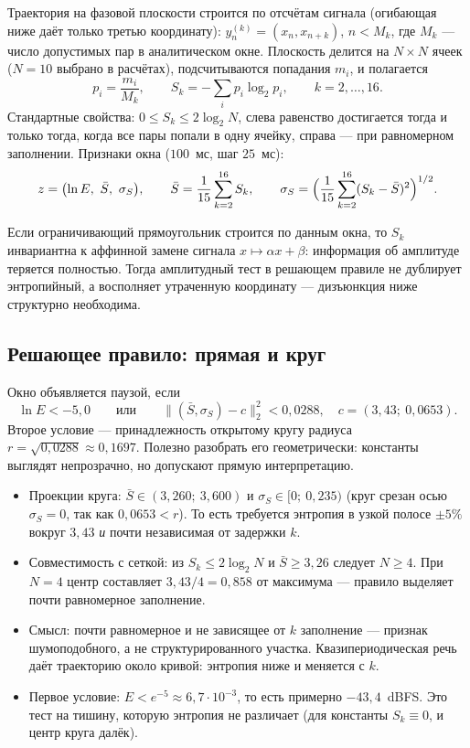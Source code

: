 \documentclass[11pt,a4paper]{article}
\theoremstyle{definition}
\theoremstyle{plain}
\begin{document}
Траектория на фазовой плоскости строится по отсчётам сигнала (огибающая ниже
даёт только третью координату): $y^{(k)}_n=(x_n,x_{n+k})$, $n<M_k$, где
$M_k$ --- число допустимых пар в аналитическом окне. Плоскость делится на
$N\times N$ ячеек ($N=10$ выбрано в расчётах), подсчитываются попадания
$m_i$, и полагается
\begin{equation}\label{eq:entropy}
p_i=\frac{m_i}{M_k},\qquad
S_k=-\sum_i p_i\log_2 p_i,\qquad k=2,\dots,16 .
\end{equation}
Стандартные свойства: $0\le S_k\le 2\log_2 N$, слева равенство достигается
тогда и только тогда, когда все пары попали в одну ячейку, справа --- при
равномерном заполнении. Признаки окна ($100$~мс, шаг $25$~мс):
\[
z=\bigl(\ln E,\ \bar S,\ \sigma_S\bigr),\qquad
\bar S=\frac1{15}\sum_{k=2}^{16}S_k,\qquad
\sigma_S=\Bigl(\frac1{15}\sum_{k=2}^{16}(S_k-\bar S)^2\Bigr)^{1/2}.
\]

Если ограничивающий прямоугольник строится по данным окна, то $S_k$
инвариантна к аффинной замене сигнала $x\mapsto\alpha x+\beta$: информация об
амплитуде теряется полностью. Тогда амплитудный тест в решающем правиле не
дублирует энтропийный, а восполняет утраченную координату --- дизъюнкция ниже
структурно необходима.

\subsection{Решающее правило: прямая и круг}

Окно объявляется паузой, если
\begin{equation}\label{eq:rule}
\ln E<-5{,}0
\qquad\text{или}\qquad
\bigl\|( \bar S,\sigma_S)-c\bigr\|_2^2<0{,}0288,
\quad c=(3{,}43;\ 0{,}0653).
\end{equation}
Второе условие --- принадлежность открытому кругу радиуса
$r=\sqrt{0{,}0288}\approx0{,}1697$. Полезно разобрать его геометрически:
константы выглядят непрозрачно, но допускают прямую интерпретацию.

\begin{itemize}[leftmargin=1.4em]
  \item Проекции круга: $\bar S\in(3{,}260;\ 3{,}600)$ и
        $\sigma_S\in[0;\ 0{,}235)$ (круг срезан осью $\sigma_S=0$, так как
        $0{,}0653<r$). То есть требуется энтропия в узкой полосе $\pm5\%$
        вокруг $3{,}43$ \emph{и} почти независимая от задержки $k$.
  \item Совместимость с сеткой: из $S_k\le2\log_2N$ и $\bar S\ge3{,}26$
        следует $N\ge4$. При $N=4$ центр составляет $3{,}43/4=0{,}858$ от
        максимума --- правило выделяет почти равномерное заполнение.
  \item Смысл: почти равномерное и не зависящее от $k$ заполнение --- признак
        шумоподобного, а не структурированного участка. Квазипериодическая
        речь даёт траекторию около кривой: энтропия ниже и меняется с $k$.
  \item Первое условие: $E<e^{-5}\approx6{,}7\cdot10^{-3}$, то есть примерно
        $-43{,}4$~dBFS. Это тест на тишину, которую энтропия не различает
        (для константы $S_k\equiv0$, и центр круга далёк).
\end{itemize}
\end{document}
